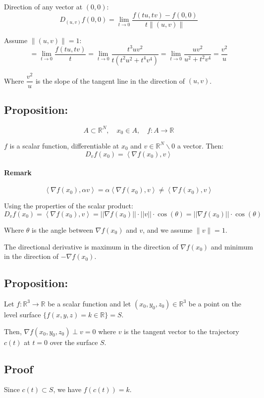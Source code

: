\documentclass[11pt]{article}
\newcommand{\inner}[2]{\left\langle #1, #2 \right\rangle}
\begin{document}
Direction of any vector at $(0,0)$:
\[
D_{(u,v)} f(0,0) = \lim_{t \to 0} \frac{f(tu, tv) - f(0,0)}{t \|(u,v)\|}
\]

Assume $\|(u,v)\| = 1$:
\[
= \lim_{t \to 0} \frac{f(tu, tv)}{t} = \lim_{t \to 0} \frac{t^3 u v^2}{t(t^2 u^2 + t^4 v^4)} = \lim_{t \to 0} \frac{u v^2}{u^2 + t^2 v^4} = \frac{v^2}{u}
\]

Where $\dfrac{v^2}{u}$ is the slope of the tangent line in the direction of $(u,v)$.

\subsection{Proposition:}
\[
A \subset \mathbb{R}^N, \quad x_0 \in A, \quad f : A \rightarrow \mathbb{R}
\]

$f$ is a scalar function, differentiable at $x_0$ and $v \in \mathbb{R}^N \backslash 0$ a vector. Then:
\[
D_v f(x_0) = \inner{\nabla f(x_0)}{v}
\]

\paragraph{Remark}
\[
\inner{\nabla f(x_0)}{\alpha v} = \alpha \inner{\nabla f(x_0)}{v} \neq \inner{\nabla f(x_0)}{v}
\]

Using the properties of the scalar product: 
\[
D_v f(x_0) = \inner{\nabla f(x_0)}{v} = ||\nabla f(x_0)|| \cdot ||v|| \cdot \cos(\theta) = ||\nabla f(x_0)|| \cdot \cos(\theta)
\]

Where $\theta$ is the angle between $\nabla f(x_0)$ and $v$, and we assume $\|v\| = 1$.

The directional derivative is maximum in the direction of $\nabla f(x_0)$ and minimum in the direction of $-\nabla f(x_0)$.

\subsection{Proposition:}
Let \( f: \mathbb{R}^3 \rightarrow \mathbb{R} \) be a scalar function and let \((x_0, y_0, z_0) \in \mathbb{R}^3\) be a point on the level surface \(\{ f(x, y, z) = k \in \mathbb{R} \} = S\).

Then, \( \nabla f(x_0, y_0, z_0) \perp v = 0 \) where \(v\) is the tangent vector to the trajectory \(c(t)\) at \(t = 0\) over the surface \(S\).

\subsection*{Proof}
Since \(c(t) \subset S\), we have \(f(c(t)) = k\).
\end{document}
